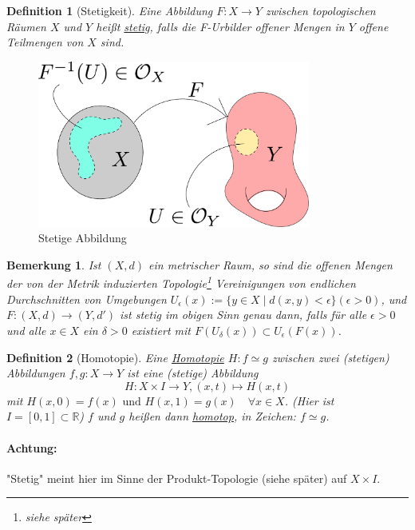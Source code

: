 \documentclass[a4paper,11pt,notitlepage]{report}
\newtheorem{definition}{Definition}[chapter]
\newtheorem{remark}{Bemerkung}[chapter]
\newcommand{\R}{{\ensuremath{\mathbb{R}}}}
\begin{document}
\begin{definition}[Stetigkeit]
Eine Abbildung $F \colon X \rightarrow Y$ zwischen topologischen Räumen $X$ und $Y$ heißt \underline{stetig}, falls die F-Urbilder offener Mengen in $Y$ offene Teilmengen von $X$ sind.
\end{definition}

\begin{figure}[h]
\centering
\includegraphics[width=0.8\textwidth]{images/stetigeAbb.pdf}
\caption{Stetige Abbildung}
\end{figure}

\begin{remark}
Ist $(X,d)$ ein metrischer Raum, so sind die offenen Mengen der von der Metrik induzierten Topologie\footnote{siehe später} Vereinigungen von endlichen Durchschnitten von Umgebungen
$U_{\epsilon}(x):=\{y \in X \mid d (x,y) < \epsilon \} (\epsilon > 0)$, 
und $F \colon (X,d) \rightarrow (Y,d')$ ist stetig im obigen Sinn genau dann, falls für alle $\epsilon > 0$ und alle $x \in X$ ein $\delta > 0$ existiert mit $F(U_\delta (x)) \subset U_\epsilon (F(x))$.
\end{remark}

\begin{definition}[Homotopie]
Eine \underline{Homotopie} $H \colon f \simeq g$ zwischen zwei (stetigen) Abbildungen $f,g \colon X \rightarrow Y$ ist eine (stetige) Abbildung $$H \colon X \times I \rightarrow Y, (x,t) \mapsto H(x,t)$$ 
mit $H(x,0) = f(x) \text{ und } H(x,1) = g(x) \quad \forall x \in X$.
\newline
(Hier ist $I = [0,1] \subset \R$)
\newline
$f$ und $g$ heißen dann \underline{homotop}, in Zeichen: $f \simeq g$.
\end{definition}

\paragraph{Achtung:} "Stetig" meint hier im Sinne der Produkt-Topologie (siehe später) auf $
X \times I$.
\end{document}
